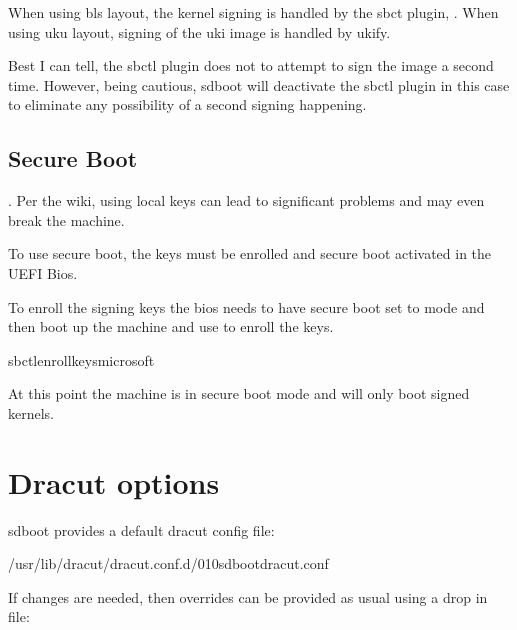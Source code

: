 \documentclass[letterpaper,11pt,english]{sphinxmanual}
\begin{document}
\sphinxAtStartPar
When using bls layout, the kernel signing is handled by the sbct plugin, .
When using uku layout, signing of the uki image is handled by ukify.

\sphinxAtStartPar
Best I can tell, the sbctl plugin does not to attempt to sign the image a second time. However,
being cautious, sd\sphinxhyphen{}boot will de\sphinxhyphen{}activate the sbctl plugin in this case to eliminate any possibility
of a second signing happening.


\section{Secure Boot}
\label{\detokenize{Signed-Kernels:secure-boot}}
\sphinxAtStartPar
{}. Per the wiki, using local keys can lead to significant problems and may even break
the machine.

\sphinxAtStartPar
To use secure boot, the keys must be enrolled and secure boot activated in the UEFI Bios.

\sphinxAtStartPar
To enroll the signing keys the bios needs to have secure boot set to  mode and then
boot up the machine and use  to enroll the keys.

\begin{sphinxVerbatim}[commandchars=\\\{\}]
sbctlenroll\PYGZhy{}keys\PYGZhy{}\PYGZhy{}microsoft
\end{sphinxVerbatim}

\sphinxAtStartPar
At this point the machine is in secure boot mode and will only boot signed kernels.

\sphinxstepscope


\chapter{Dracut options}
\label{\detokenize{Dracut-Options:dracut-options}}\label{\detokenize{Dracut-Options::doc}}
\sphinxAtStartPar
sd\sphinxhyphen{}boot provides a default dracut config file:

\begin{sphinxVerbatim}[commandchars=\\\{\}]
/usr/lib/dracut/dracut.conf.d/010\PYGZhy{}sd\PYGZhy{}boot\PYGZhy{}dracut.conf
\end{sphinxVerbatim}

\sphinxAtStartPar
If changes are needed, then over\sphinxhyphen{}rides can be provided as usual using a drop in file:
\end{document}
